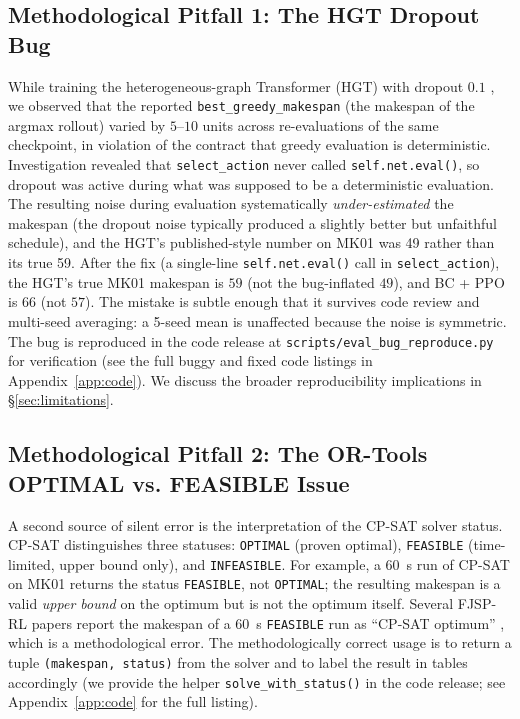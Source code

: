 \documentclass[10pt]{article}
\theoremstyle{definition}
\begin{document}
\subsection{Methodological Pitfall 1: The HGT Dropout Bug}
\label{sec:lessons-hgt}

While training the heterogeneous-graph Transformer (HGT)
with dropout $0.1$ \citep{Hu2020HGT}, we observed that
the reported \texttt{best\_greedy\_makespan} (the
makespan of the argmax rollout) varied by $5$--$10$
units across re-evaluations of the same checkpoint, in
violation of the contract that greedy evaluation is
deterministic. Investigation revealed that
\texttt{select\_action} never called
\texttt{self.net.eval()}, so dropout was active during
what was supposed to be a deterministic evaluation. The
resulting noise during evaluation systematically
\emph{under-estimated} the makespan (the dropout noise
typically produced a slightly better but unfaithful
schedule), and the HGT's published-style number on MK01
was 49 rather than its true 59. After the fix (a
single-line \texttt{self.net.eval()} call in
\texttt{select\_action}), the HGT's true MK01 makespan is
$59$ (not the bug-inflated $49$), and BC + PPO is $66$
(not $57$). The mistake is subtle enough that it
survives code review and multi-seed averaging: a 5-seed
mean is unaffected because the noise is symmetric. The
bug is reproduced in the code release at
\texttt{scripts/eval\_bug\_reproduce.py} for verification
(see the full buggy and fixed code listings in
Appendix~\ref{app:code}). We discuss the broader
reproducibility implications in
\S\ref{sec:limitations}.

\subsection{Methodological Pitfall 2: The OR-Tools OPTIMAL vs. FEASIBLE Issue}
\label{sec:lessons-ortools}

A second source of silent error is the interpretation
of the CP-SAT solver status. CP-SAT distinguishes three
statuses: \texttt{OPTIMAL} (proven optimal), \texttt{FEASIBLE}
(time-limited, upper bound only), and \texttt{INFEASIBLE}.
For example, a 60~s run of CP-SAT on MK01 returns the
status \texttt{FEASIBLE}, not \texttt{OPTIMAL}; the
resulting makespan is a valid \emph{upper bound} on the
optimum but is not the optimum itself. Several FJSP-RL
papers report the makespan of a 60~s \texttt{FEASIBLE}
run as ``CP-SAT optimum''
\citep{Song2022TII, Yang2024}, which is a methodological
error. The methodologically correct usage is to return
a tuple \texttt{(makespan, status)} from the solver and
to label the result in tables accordingly (we provide
the helper \texttt{solve\_with\_status()} in the code
release; see Appendix~\ref{app:code} for the full
listing).
\end{document}
